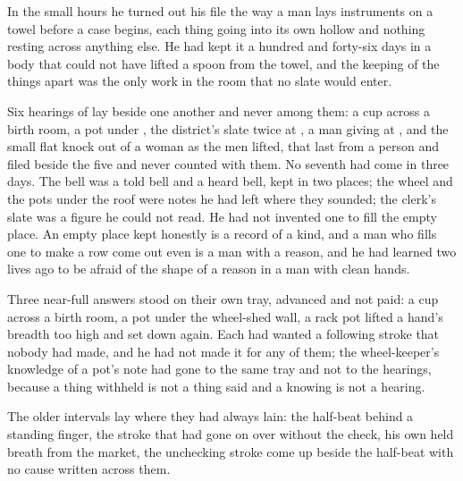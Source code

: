 \scenebreak

In the small hours he turned out his file the way a man lays instruments on a towel before a case begins, each thing going into its own hollow and nothing resting across anything else. He had kept it a hundred and forty-six days in a body that could not have lifted a spoon from the towel, and the keeping of the things apart was the only work in the room that no slate would enter.

Six hearings of  lay beside one another and never among them: a cup across a birth room, a pot under , the district's slate twice at , a man giving at , and the small flat knock out of a woman as the men lifted, that last from a person and filed beside the five and never counted with them. No seventh had come in three days. The bell was a told bell and a heard bell, kept in two places; the wheel and the pots under the roof were notes he had left where they sounded; the clerk's slate was a figure he could not read. He had not invented one to fill the empty place. An empty place kept honestly is a record of a kind, and a man who fills one to make a row come out even is a man with a reason, and he had learned two lives ago to be afraid of the shape of a reason in a man with clean hands.

Three near-full answers stood on their own tray, advanced and not paid: a cup across a birth room, a pot under the wheel-shed wall, a rack pot lifted a hand's breadth too high and set down again. Each had wanted a following stroke that nobody had made, and he had not made it for any of them; the wheel-keeper's knowledge of a pot's note had gone to the same tray and not to the hearings, because a thing withheld is not a thing said and a knowing is not a hearing.

The older intervals lay where they had always lain: the half-beat behind a standing finger, the stroke that had gone on over  without the check, his own held breath from the market, the unchecking stroke come up beside the half-beat with no cause written across them.

